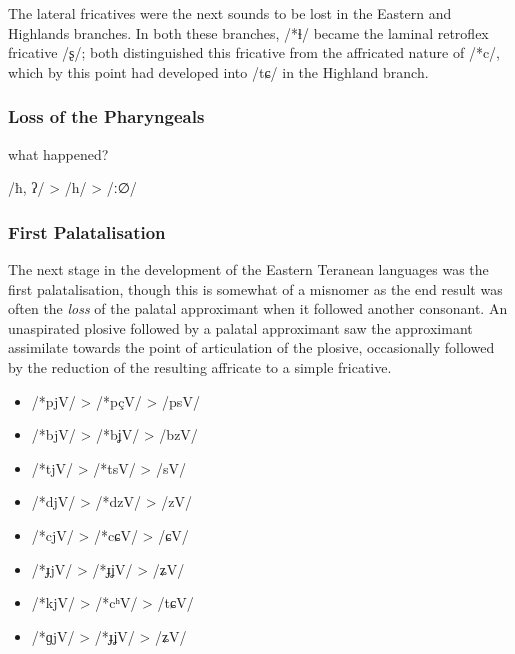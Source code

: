 \documentclass[grammar]{subfiles}
\begin{document}
The lateral fricatives were the next sounds to be lost in the Eastern and
Highlands branches.  In both these branches, /*ɬ/ became the laminal retroflex
fricative /ʂ/; both distinguished this fricative from the affricated nature of
/*c/, which by this point had developed into /tɕ/ in the Highland branch.

%

\subsubsection{Loss of the Pharyngeals}
\label{sssec:history:east:pharyngeals}

\Tbw what happened?

/ħ, ʔ/ > /h/ > /ː∅/

\subsubsection{First Palatalisation}
\label{sssec:history:east:first_palatalisation}

The next stage in the development of the Eastern Teranean languages was the
first palatalisation, though this is somewhat of a misnomer as the end result
was often the \emph{loss} of the palatal approximant when it followed another
consonant.  An unaspirated plosive followed by a palatal approximant saw the
approximant assimilate towards the point of articulation of the plosive,
occasionally followed by the reduction of the resulting affricate to a simple
fricative.

\begin{itemize}
  \item /*pjV/ > /*pçV/ > /psV/
  \item /*bjV/ > /*bʝV/ > /bzV/
  \item /*tjV/ > /*tsV/ > /sV/
  \item /*djV/ > /*dzV/ > /zV/
  \item /*cjV/ > /*cɕV/ > /ɕV/
  \item /*ɟjV/ > /*ɟʝV/ > /ʑV/
  \item /*kjV/ > /*cʰV/ > /tɕV/
  \item /*ɡjV/ > /*ɟʝV/ > /ʑV/
\end{itemize}
\end{document}
